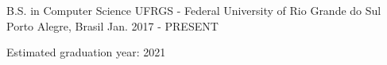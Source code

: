 \begin{cventries}
  \cventry
    {B.S. in Computer Science}
    {UFRGS - Federal University of Rio Grande do Sul}
    {Porto Alegre, Brasil}
    {Jan. 2017 - PRESENT}
    {
      \begin{cvitems}
        \item {Estimated graduation year: 2021}
      \end{cvitems}
    }
\end{cventries}
